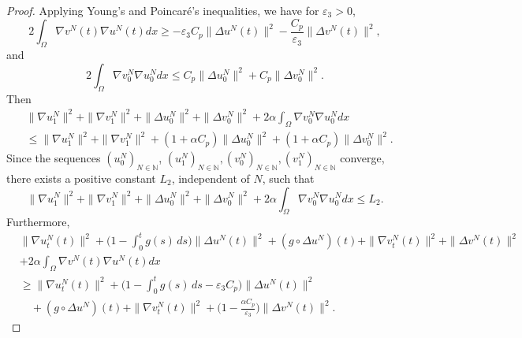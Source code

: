 \begin{proof}
Applying Young's and Poincar\'e's inequalities, we have for $\varepsilon_{3}> 0$,
 \begin{equation*}
 2\int_{\Omega} \nabla v^N(t) \nabla u^N(t) dx
 \geq - \varepsilon_{3} C_p\| \Delta u^N(t) \|^2 - \frac{C_p}{\varepsilon_{3}}\| \Delta v^N(t) \|^2,
 \end{equation*}
and
\[
 2 \int_{\Omega} \nabla v^N_0 \nabla u^N_0 dx
 \leq C_p\| \Delta u^N_0 \|^2 +C_p \| \Delta v^N_0 \|^2.
\]
Then
\begin{equation}
\begin{aligned}
& \| \nabla u^N_{1} \|^2+ \| \nabla v^N_{1} \|^2+\| \Delta u^N_0 \|^2
 + \| \Delta v^N_0 \|^2 +2 \alpha \int_{\Omega} \nabla v^N_0 \nabla u^N_0 dx \\
&\leq \| \nabla u^N_{1} \|^2+ \| \nabla v^N_{1} \|^2
 +(1+\alpha C_p) \| \Delta u^N_0 \|^2
 +(1+\alpha C_p)\| \Delta v^N_0 \|^2.
\end{aligned} \label{e3.16}
\end{equation}
Since the sequences $ (u_0^N)_{N \in \mathbb{N}}$,
$ (u_1^N)_{N \in \mathbb{N}}, (v_0^N)_{N \in \mathbb{N}}, (v_1^N)_{N \in \mathbb{N}} $
converge, there exists a positive constant $L_2$, independent of $N$, such that
\begin{equation}
 \| \nabla u^N_{1} \|^2+ \| \nabla v^N_{1} \|^2
 +\| \Delta u^N_0 \|^2 + \| \Delta v^N_0 \|^2
 +2 \alpha \int_{\Omega} \nabla v^N_0 \nabla u^N_0 dx\leq L_2. \label{e3.17}
\end{equation}
Furthermore,
\begin{align*}
&\| \nabla u^N_{t}(t) \|^2+\Big( 1 - \int_0^t g(s)\,ds \Big) \| \Delta u^N(t) \|^2
 + (g \circ \Delta u^N)(t) + \| \nabla v^N_{t}(t) \|^2+ \| \Delta v^N (t)\|^2 \\
&+2 \alpha \int_{\Omega} \nabla v^N (t)\nabla u^N(t) dx \\
&\geq \| \nabla u^N_{t}(t) \|^2+\Big( 1 - \int_0^t g(s)\,ds
 - \varepsilon_{3} C_p \Big) \| \Delta u^N(t) \|^2 \\
&\quad + (g \circ \Delta u^N)(t) + \| \nabla v^N_{t}(t) \|^2
 +\Big( 1-\frac{\alpha C_p}{\varepsilon_{3}}\Big) \| \Delta v^N(t) \|^2.
\end{align*}


\end{proof}
